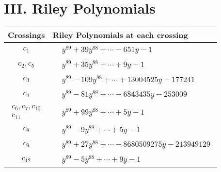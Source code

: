 \documentclass[1p]{elsarticle_modified}
\theoremstyle{definition}
\begin{document}
\centering \section*{ III. Riley Polynomials}
\begin{tabular}{m{50pt}|m{274pt}}
Crossings & \hspace{64pt}Riley Polynomials at each crossing \\
\hline $$\begin{aligned}c_{1}\end{aligned}$$&$\begin{aligned}
&y^{89}+39 y^{88}+\cdots-651 y-1
\end{aligned}$\\
\hline $$\begin{aligned}c_{2},c_{5}\end{aligned}$$&$\begin{aligned}
&y^{89}+35 y^{88}+\cdots+9 y-1
\end{aligned}$\\
\hline $$\begin{aligned}c_{3}\end{aligned}$$&$\begin{aligned}
&y^{89}-109 y^{88}+\cdots+13004525 y-177241
\end{aligned}$\\
\hline $$\begin{aligned}c_{4}\end{aligned}$$&$\begin{aligned}
&y^{89}-81 y^{88}+\cdots-6843435 y-253009
\end{aligned}$\\
\hline $$\begin{aligned}c_{6},c_{7},c_{10}\\c_{11}\end{aligned}$$&$\begin{aligned}
&y^{89}+99 y^{88}+\cdots+5 y-1
\end{aligned}$\\
\hline $$\begin{aligned}c_{8}\end{aligned}$$&$\begin{aligned}
&y^{89}-9 y^{88}+\cdots+5 y-1
\end{aligned}$\\
\hline $$\begin{aligned}c_{9}\end{aligned}$$&$\begin{aligned}
&y^{89}+27 y^{88}+\cdots-8680509275 y-213949129
\end{aligned}$\\
\hline $$\begin{aligned}c_{12}\end{aligned}$$&$\begin{aligned}
&y^{89}-5 y^{88}+\cdots+9 y-1
\end{aligned}$\\
\hline
\end{tabular}
\vskip 2pc
\end{document}
